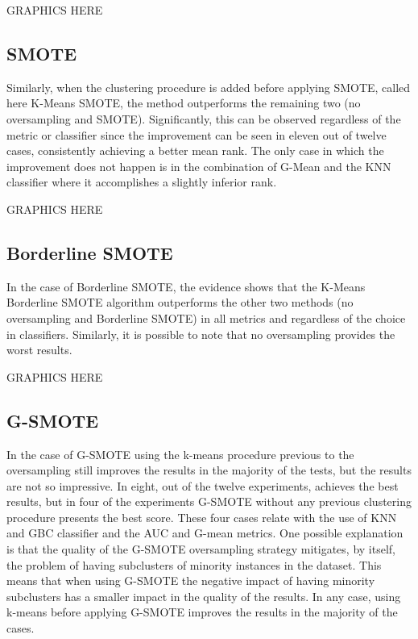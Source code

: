 \documentclass[parskip=full]{scrartcl}
\begin{document}
GRAPHICS HERE

\subsection{SMOTE}

Similarly, when the clustering procedure is added before applying SMOTE, called 
here K-Means SMOTE, the method outperforms the remaining two (no oversampling 
and SMOTE). Significantly, this can be observed regardless of the metric or 
classifier since the improvement can be seen in eleven out of twelve cases, 
consistently achieving a better mean rank. The only case in which the 
improvement does not happen is in the combination of G-Mean and the KNN 
classifier where it accomplishes a slightly inferior rank. 

GRAPHICS HERE

\subsection{Borderline SMOTE}

In the case of Borderline SMOTE, the evidence shows that the K-Means Borderline 
SMOTE algorithm outperforms the other two methods (no oversampling and 
Borderline SMOTE) in all metrics and regardless of the choice in classifiers. 
Similarly, it is possible to note that no oversampling provides the worst 
results.

GRAPHICS HERE

\subsection{G-SMOTE}

In the case of G-SMOTE using the k-means procedure previous to the oversampling 
still improves the results in the majority of the tests, but the results are 
not so impressive. In eight, out of the twelve experiments, achieves the best 
results, but in four of the experiments G-SMOTE without any previous clustering 
procedure presents the best score. These four cases relate with the use of KNN 
and GBC classifier and the AUC and G-mean metrics. One possible explanation is 
that the quality of the G-SMOTE oversampling strategy mitigates, by itself, the 
problem of having subclusters of minority instances in the dataset. This means 
that when using G-SMOTE the negative impact of having minority subclusters has 
a smaller impact in the quality of the results. In any case, using k-means 
before applying G-SMOTE improves the results in the majority of the cases.
\end{document}
